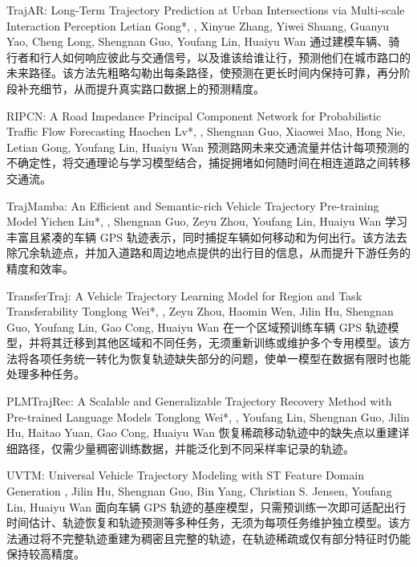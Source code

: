 {TrajAR: Long-Term Trajectory Prediction at Urban Intersections via Multi-scale Interaction Perception}
{Letian Gong*, \me*, Xinyue Zhang, Yiwei Shuang, Guanyu Yao, Cheng Long, Shengnan Guo, Youfang Lin, Huaiyu Wan}
{通过建模车辆、骑行者和行人如何响应彼此与交通信号，以及谁该给谁让行，预测他们在城市路口的未来路径。该方法先粗略勾勒出每条路径，使预测在更长时间内保持可靠，再分阶段补充细节，从而提升真实路口数据上的预测精度。}

{RIPCN: A Road Impedance Principal Component Network for Probabilistic Traffic Flow Forecasting}
{Haochen Lv*, \me*, Shengnan Guo, Xiaowei Mao, Hong Nie, Letian Gong, Youfang Lin, Huaiyu Wan}
{预测路网未来交通流量并估计每项预测的不确定性，将交通理论与学习模型结合，捕捉拥堵如何随时间在相连道路之间转移交通流。}

{TrajMamba: An Efficient and Semantic-rich Vehicle Trajectory Pre-training Model}
{Yichen Liu*, \me*, Shengnan Guo, Zeyu Zhou, Youfang Lin, Huaiyu Wan}
{学习丰富且紧凑的车辆 GPS 轨迹表示，同时捕捉车辆如何移动和为何出行。该方法去除冗余轨迹点，并加入道路和周边地点提供的出行目的信息，从而提升下游任务的精度和效率。}

{TransferTraj: A Vehicle Trajectory Learning Model for Region and Task Transferability}
{Tonglong Wei*, \me*, Zeyu Zhou, Haomin Wen, Jilin Hu, Shengnan Guo, Youfang Lin, Gao Cong, Huaiyu Wan}
{在一个区域预训练车辆 GPS 轨迹模型，并将其迁移到其他区域和不同任务，无须重新训练或维护多个专用模型。该方法将各项任务统一转化为恢复轨迹缺失部分的问题，使单一模型在数据有限时也能处理多种任务。}

{PLMTrajRec: A Scalable and Generalizable Trajectory Recovery Method with Pre-trained Language Models}
{Tonglong Wei*, \me*, Youfang Lin, Shengnan Guo, Jilin Hu, Haitao Yuan, Gao Cong, Huaiyu Wan}
{恢复稀疏移动轨迹中的缺失点以重建详细路径，仅需少量稠密训练数据，并能泛化到不同采样率记录的轨迹。}

{UVTM: Universal Vehicle Trajectory Modeling with ST Feature Domain Generation}
{\me, Jilin Hu, Shengnan Guo, Bin Yang, Christian S. Jensen, Youfang Lin, Huaiyu Wan}
{面向车辆 GPS 轨迹的基座模型，只需预训练一次即可适配出行时间估计、轨迹恢复和轨迹预测等多种任务，无须为每项任务维护独立模型。该方法通过将不完整轨迹重建为稠密且完整的轨迹，在轨迹稀疏或仅有部分特征时仍能保持较高精度。}

